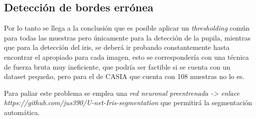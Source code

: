 \subsection{Detección de bordes errónea}

Por lo tanto se llega a la conclusión que es posible aplicar un \emph{thresholding} común para todas las muestras pero únicamente para la detección de la pupila, mientras que para la detección del iris, se deberá ir probando constantemente hasta encontrar el apropiado para cada imagen, esto se correspondería con una técnica de fuerza bruta muy ineficiente, que podría ser factible si se cuenta con un dataset pequeño, pero para el de CASIA que cuenta con 108 muestras no lo es.

Para paliar este problema se emplea una \emph{red neuronal preentrenada -> enlace https://github.com/jus390/U-net-Iris-segmentation} que permitirá la segmentación automática.




